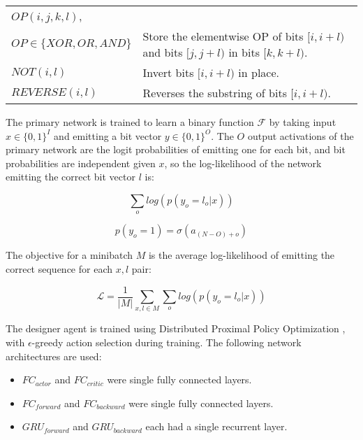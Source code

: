 \documentclass{article}[12px]
\begin{document}
\begin{center}
  \begin{tabular}{| p{4cm} | p{6cm} |}
    \hline
    \(OP(i, j, k, l)\), & \\ \(OP\in\{XOR, OR, AND\}\) & Store the elementwise OP of bits \([i, i + l)\) and bits \([j, j + l)\) in bits \([k, k + l)\). \\
    \(NOT(i, l)\) & Invert bits \([i, i + l)\) in place. \\
    \(REVERSE(i, l)\) & Reverses the substring of bits \([i, i + l)\). \\
    \hline
  \end{tabular}
\end{center}

The primary network is trained to learn a binary function \(\mathcal{F}\) by taking input \(x \in \{0, 1\}^I\) and emitting a bit vector \(y \in \{0, 1\}^O\). The \(O\) output activations of the primary network are the logit probabilities of emitting one for each bit, and bit probabilities are independent given \(x\), so the log-likelihood of the network emitting the correct bit vector \(l\) is:

\begin{equation}
  \sum_o log(p(y_o = l_o | x))
\end{equation}

\begin{equation}
  p(y_o = 1) = \sigma(a_{(N - O) + o})
\end{equation}

The objective for a minibatch \(M\) is the average log-likelihood of emitting the correct sequence for each \(x, l\) pair:

\begin{equation}
  \mathcal{L} = \frac{1}{|M|} \sum_{x, l \in M}\sum_o log(p(y_o = l_o | x))
\end{equation}

The designer agent is trained using Distributed Proximal Policy Optimization \cite{DBLP:journals/corr/HeessTSLMWTEWER17}, with \(\epsilon\)-greedy action selection during training. The following network architectures are used:

\begin{itemize}
  \item{\(FC_{actor}\) and \(FC_{critic}\) were single fully connected layers.}
  \item{\(FC_{forward}\) and \(FC_{backward}\) were single fully connected layers.}
  \item{\(GRU_{forward}\) and \(GRU_{backward}\) each had a single recurrent layer.}
\end{itemize}
\end{document}
